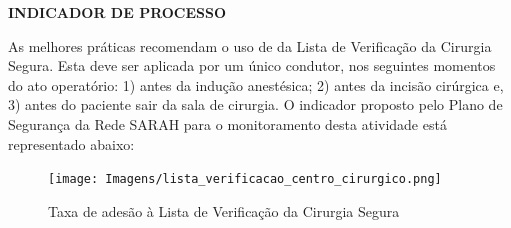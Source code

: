 \documentclass[
  a4paper]{article}
\begin{document}
\begin{table}[H]

\caption{\label{tab:unnamed-chunk-12}Número de cirurgias em local errado, programas de internação}
\centering
{}
\end{table}

\begin{table}[H]

\caption{\label{tab:unnamed-chunk-13}Número de procedimentos cirúrgicos errados, programas de internação}
\centering
{}
\end{table}

\textbf{INDICADOR DE PROCESSO}

\hspace{1cm} As melhores práticas recomendam o uso de da Lista de
Verificação da Cirurgia Segura. Esta deve ser aplicada por um único
condutor, nos seguintes momentos do ato operatório: 1) antes da indução
anestésica; 2) antes da incisão cirúrgica e, 3) antes do paciente sair
da sala de cirurgia. O indicador proposto pelo Plano de Segurança da
Rede SARAH para o monitoramento desta atividade está representado
abaixo:

\begin{figure}[H]
\caption{Taxa de adesão à Lista de Verificação da Cirurgia Segura}
\texttt{[image: Imagens/lista\_verificacao\_centro\_cirurgico.png]}
\end{figure}
\end{document}
